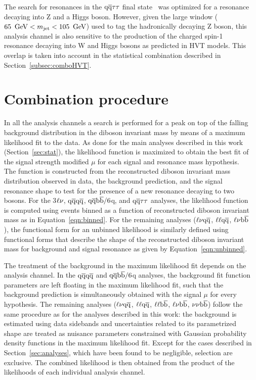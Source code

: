 The search for resonances in the $\mathrm{q}\overline{\mathrm{q}} \tau\tau$ final state~\cite{Khachatryan:2015bma} was optimized for a resonance \Zpr decaying into Z and a Higgs boson.
However, given the large \mJ window ($65~\,\text{Ge\hspace{-.08em}V} <  m_{\text{jet}} < 105~\,\text{Ge\hspace{-.08em}V}$) used to tag the hadronically decaying Z boson, this analysis channel is also sensitive to the production of the charged spin-1 \Wpr resonance decaying into W and Higgs bosons as predicted in HVT models. This overlap is taken into account in the statistical combination described in Section~\ref{subsec:comboHVT}.

\section{Combination procedure}\label{sec:combination}

In all the analysis channels a search is performed for a peak on top of the falling background distribution in the diboson invariant mass by means of a maximum likelihood fit to the data.
As done for the main analyses described in this work (Section~\ref{sec:stat}), the likelihood function is maximized to obtain the best fit of the signal strength modified $\mu$ for each signal and resonance mass hypothesis.
The function is constructed from the reconstructed diboson invariant mass distribution observed in data, the background prediction, and the signal resonance shape to test for the presence of a new resonance decaying to two bosons.
For the 3$\ell\nu$, $\mathrm{q}\overline{\mathrm{q}} \mathrm{q}\overline{\mathrm{q}}$, $\mathrm{q}\overline{\mathrm{q}}{\mathrm{b}\overline{\mathrm{b}}}/6$q, and $\mathrm{q}\overline{\mathrm{q}} \tau\tau $ analyses, the likelihood function is computed using events binned as a function of reconstructed diboson invariant mass as in Equation~\ref{eqn:binned}.
For the remaining analyses ($\ell \nu \mathrm{q}\overline{\mathrm{q}}$,  $\ell\ell \mathrm{q}\overline{\mathrm{q}}$, $\ell \nu {\mathrm{b}\overline{\mathrm{b}}}$), the functional form for an unbinned likelihood is similarly defined using functional forms that describe the shape of the reconstructed diboson invariant mass for background and signal resonance as given by Equation~\ref{eqn:unbinned}.

The treatment of the background in the maximum likelihood fit depends on the analysis channel.
In the $\mathrm{q}\overline{\mathrm{q}} \mathrm{q}\overline{\mathrm{q}}$ and $\mathrm{q}\overline{\mathrm{q}}{\mathrm{b}\overline{\mathrm{b}}}/6$q analyses, the background fit function parameters are left floating in the maximum likelihood fit, such that the background prediction is simultaneously obtained with the signal $\mu$ for every hypothesis.
The remaining analyses ($\ell \nu \mathrm{q}\overline{\mathrm{q}}$,  $\ell\ell \mathrm{q}\overline{\mathrm{q}}$, $\ell \ell {\mathrm{b}\overline{\mathrm{b}}}$, $\ell \nu {\mathrm{b}\overline{\mathrm{b}}}$, $\nu \nu {\mathrm{b}\overline{\mathrm{b}}}$) follow the same procedure as for the analyses described in this work: the background is estimated using data sidebands and uncertainties related to its parametrized shape are treated as nuisance parameters constrained with Gaussian probability density functions in the maximum likelihood fit. Except for the cases described in Section~\ref{sec:analyses}, which have been found to be negligible, selection are exclusive. The combined likelihood is then obtained from the product of the likelihoods of each individual analysis channel.

